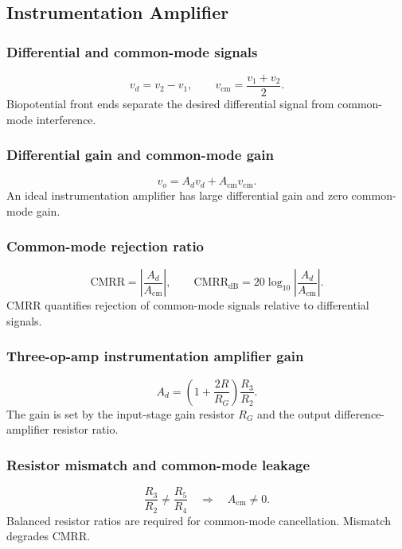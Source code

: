 \subsection{Instrumentation Amplifier}

\subsubsection{Differential and common-mode signals}
\[
v_d=v_2-v_1,\qquad
v_{\mathrm{cm}}=\frac{v_1+v_2}{2}.
\]
Biopotential front ends separate the desired differential signal from common-mode interference.

\subsubsection{Differential gain and common-mode gain}
\[
v_o=A_d v_d + A_{\mathrm{cm}}v_{\mathrm{cm}}.
\]
An ideal instrumentation amplifier has large differential gain and zero common-mode gain.

\subsubsection{Common-mode rejection ratio}
\[
\mathrm{CMRR}=\left|\frac{A_d}{A_{\mathrm{cm}}}\right|,
\qquad
\mathrm{CMRR}_{\mathrm{dB}}=20\log_{10}\left|\frac{A_d}{A_{\mathrm{cm}}}\right|.
\]
CMRR quantifies rejection of common-mode signals relative to differential signals.

\subsubsection{Three-op-amp instrumentation amplifier gain}
\[
A_d=\left(1+\frac{2R}{R_G}\right)\frac{R_3}{R_2}.
\]
The gain is set by the input-stage gain resistor \(R_G\) and the output difference-amplifier resistor ratio.

\subsubsection{Resistor mismatch and common-mode leakage}
\[
\frac{R_3}{R_2}\neq \frac{R_5}{R_4}\quad \Rightarrow\quad A_{\mathrm{cm}}\neq 0.
\]
Balanced resistor ratios are required for common-mode cancellation. Mismatch degrades CMRR.
